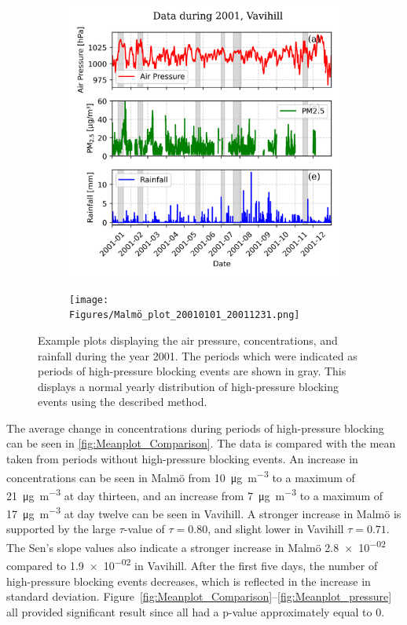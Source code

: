 \begin{figure}[H]
    \centering
    \begin{subfigure}[b]{0.49\textwidth}
        \centering
        \includegraphics[width=\textwidth]{Figures/Vavihill_plot_20010101_20011231.png}
        \label{fig:2001Vavihill}
    \end{subfigure}
    \hfill
    \begin{subfigure}[b]{0.49\textwidth}
        \centering
        \texttt{[image: Figures/Malmö\_plot\_20010101\_20011231.png]}
        \label{fig:2001Malmö}
    \end{subfigure}
    \caption{Example plots displaying the air pressure, \PM concentrations, and rainfall during the year 2001. The periods which were indicated as periods of high-pressure blocking events are shown in gray. This displays a normal yearly distribution of high-pressure blocking events using the described method.}
    \label{fig:2001}
\end{figure}

The average change in \PM concentrations during periods of high-pressure blocking can be seen in \autoref{fig:Meanplot_Comparison}. The data is compared with the \PM mean taken from periods without high-pressure blocking events. An increase in \PM concentrations can be seen in Malmö from \SI{10}{\micro\gram\per\meter\cubed} to a maximum of \SI{21}{\micro\gram\per\meter\cubed} at day thirteen, and an increase from \SI{7}{\micro\gram\per\meter\cubed} to a maximum of \SI{17}{\micro\gram\per\meter\cubed} at day twelve can be seen in Vavihill. A stronger increase in Malmö is supported by the large $\tau$-value of $\tau=0.80$, and slight lower in Vavihill $\tau=0.71$. The Sen's slope values also indicate a stronger increase in Malmö \SI{2.8e-02}{} compared to \SI{1.9e-02}{} in Vavihill. After the first five days, the number of high-pressure blocking events decreases, which is reflected in the increase in standard deviation. Figure~\ref{fig:Meanplot_Comparison}--\ref{fig:Meanplot_pressure} all provided significant result since all had a p-value approximately equal to 0.


